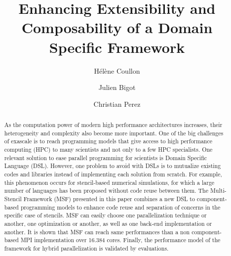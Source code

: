 \documentclass[smallextended]{svjour3}       %
\begin{document}

\title{Enhancing Extensibility and Composability of a Domain Specific Framework}
\author{H\'el\`ene Coullon \and Julien Bigot \and Christian Perez}
\maketitle
\begin{abstract}
As the computation power of modern high performance architectures increases, their heterogeneity and complexity also become more important. One of the big challenges of exascale is to reach programming models that give access to high performance computing (HPC) to many scientists and not only to a few HPC specialists. One relevant solution to ease parallel programming for scientists is Domain Specific Language (DSL). However, one problem to avoid with DSLs is to mutualize existing codes and libraries instead of implementing each solution from scratch. For example, this phenomenon occurs for stencil-based numerical simulations, for which a large number of languages has been proposed without code reuse between them. 
The Multi-Stencil Framework (MSF) presented in this paper combines a new DSL to component-based programming models to enhance code reuse and separation of concerns in the specific case of stencils. MSF can easily choose one parallelization technique or another, one optimization or another, as well as one back-end implementation or another. It is shown that MSF can reach same performances than a non component-based MPI implementation over 16.384 cores. Finally, the performance model of the framework for hybrid parallelization is validated by evaluations.

\end{abstract}
\end{document}
